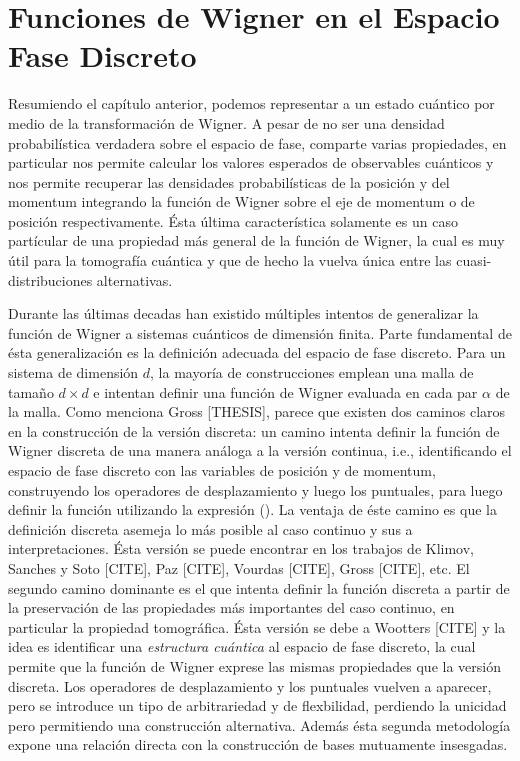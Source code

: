 \documentclass[a4paper]{report}
\begin{document}
  \chapter{Funciones de Wigner en el Espacio Fase Discreto}

  Resumiendo el capítulo anterior, podemos representar a un
  estado cuántico por medio de la transformación de Wigner.
  A pesar de no ser una densidad probabilística verdadera
  sobre el espacio de fase, comparte varias propiedades, en
  particular nos permite calcular los valores esperados de
  observables cuánticos y nos permite recuperar las
  densidades probabilísticas de la posición y del momentum
  integrando la función de Wigner sobre el eje de momentum o
  de posición respectivamente. Ésta última característica
  solamente es un caso partícular de una propiedad más
  general de la función de Wigner, la cual es muy útil para
  la tomografía cuántica y que de hecho la vuelva única
  entre las cuasi-distribuciones alternativas.

  Durante las últimas decadas han existido múltiples
  intentos de generalizar la función de Wigner a sistemas
  cuánticos de dimensión finita. Parte fundamental de ésta
  generalización es la definición adecuada del espacio de
  fase discreto. Para un sistema de dimensión $d$, la
  mayoría de construcciones emplean una malla de tamaño $d
  \times d$ e intentan definir una función de Wigner
  evaluada en cada par $\alpha$ de la malla. Como menciona
  Gross [THESIS], parece que existen dos caminos claros en
  la construcción de la versión discreta: un camino intenta
  definir la función de Wigner discreta de una manera
  análoga a la versión continua, i.e., identificando el
  espacio de fase discreto con las variables de posición y
  de momentum, construyendo los operadores de desplazamiento
  y luego los puntuales, para luego definir la función
  utilizando la expresión (). La ventaja de éste camino es
  que la definición discreta asemeja lo más posible al caso
  continuo y sus a interpretaciones.  Ésta versión se puede
  encontrar en los trabajos de Klimov, Sanches y Soto
  [CITE], Paz [CITE], Vourdas [CITE], Gross [CITE], etc. El
  segundo camino dominante es el que intenta definir la
  función discreta a partir de la preservación de las
  propiedades más importantes del caso continuo, en
  particular la propiedad tomográfica. Ésta versión se debe
  a Wootters [CITE] y la idea es identificar una
  \textit{estructura cuántica} al espacio de fase discreto,
  la cual permite que la función de Wigner exprese las
  mismas propiedades que la versión discreta.  Los
  operadores de desplazamiento y los puntuales vuelven a
  aparecer, pero se introduce un tipo de arbitrariedad y de
  flexbilidad, perdiendo la unicidad pero permitiendo una
  construcción alternativa. Además ésta segunda metodología
  expone una relación directa con la construcción de bases
  mutuamente insesgadas.
\end{document}
